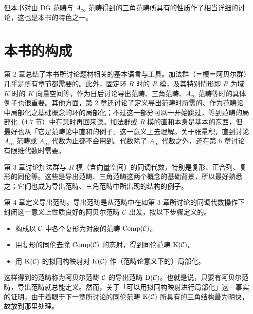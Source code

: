 但本书对由 DG 范畴与 $A_\infty$ 范畴得到的三角范畴所具有的性质作了相当详细的讨论，这也是本书的特色之一。


\section{本书的构成}

第 2 章总结了本书所讨论题材相关的基本语言与工具。加法群（＝模＝阿贝尔群）几乎是所有章节都需要的。此外，固定环 $R$ 时的 $R$ 模，及其特别情形即 $R$ 为域 $K$ 时的 $K$ 向量空间等，作为日后讨论导出范畴、三角范畴、$A_\infty$ 范畴等时的具体例子也很重要。其他方面，第 2 章还讨论了定义导出范畴时所需的、作为范畴论中局部化之基础概念的环的局部化；不过这一部分可以一开始跳过，等到范畴的局部化（4.7 节）中在意时再回来读。加法群或 $R$ 模的直和本身是基本的东西，但最好也从「它是范畴论中直和的例子」这一意义上去理解。关于张量积，直到讨论 $A_\infty$ 范畴或 $A_\infty$ 代数为止都不会用到。代数除了 $A_\infty$ 代数之外，还在第 6 章讨论有限维代数时需要。


第 3 章讨论加法群与 $R$ 模（含向量空间）的同调代数，特别是复形、正合列、复形的同伦等。这些是导出范畴、三角范畴这两个概念的基础背景，所以最好熟悉之；它们也成为导出范畴、三角范畴中所出现的结构的例子。

第 4 章定义导出范畴。导出范畴是从范畴中在如第 3 章所讨论的同调代数操作下封闭这一意义上性质良好的阿贝尔范畴 $\mathcal{C}$ 出发，按以下步骤定义的。

\begin{itemize}
\item 构成以 $\mathcal{C}$ 中各个复形为对象的范畴 $\operatorname{Comp}(\mathcal{C})$。
\item 用复形的同伦去除 $\operatorname{Comp}(\mathcal{C})$ 的态射，得到同伦范畴 $\mathrm{K}(\mathcal{C})$。
\item 用 $\mathrm{K}(\mathcal{C})$ 的拟同构映射对 $\mathrm{K}(\mathcal{C})$ 作（范畴论意义下的）局部化。
\end{itemize}

这样得到的范畴称为阿贝尔范畴 $\mathcal{C}$ 的导出范畴 $\mathrm{D}(\mathcal{C})$。也就是说，只要有阿贝尔范畴，导出范畴就总能定义。然而，关于「可以用拟同构映射进行局部化」这一事实的证明，由于着眼于下一章所讨论的同伦范畴 $\mathrm{K}(\mathcal{C})$ 所具有的三角结构最为明快，故放到那里处理。

